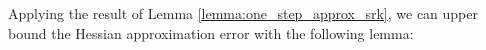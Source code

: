 \documentclass[letterpaper]{article} %
\theoremstyle{plain}
\newtheorem{lemma}[theorem]{Lemma}
\theoremstyle{definition}
\theoremstyle{remark}
\newcommand\norm[1]{\left\lVert#1\right\rVert}
\def\BR{{\mathbb{R}}}
\begin{document}
Applying the result of Lemma \ref{lemma:one_step_approx_srk}, we can upper bound the Hessian approximation error with the following lemma:
\end{document}
